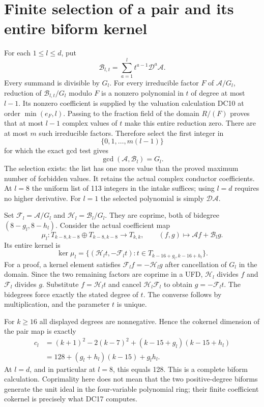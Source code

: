 \section{Finite selection of a pair and its entire biform kernel}
For each $1\le l\le d$, put
\[
 \mathcal B_{l,t}=\sum_{a=1}^{l}t^{a-1}\mathcal D^a\mathcal A.
                                                                    \tag{DC13}
\]
Every summand is divisible by $G_l$.  For every irreducible factor
$F$ of $\mathcal A/G_l$, reduction of
$\mathcal B_{l,t}/G_l$ modulo $F$ is a nonzero polynomial in $t$ of
degree at most $l-1$.  Its nonzero coefficient is supplied by the
valuation calculation DC10 at order $\min(e_F,l)$.
Passing to the fraction field of the domain $R/(F)$ proves that
at most $l-1$ complex values of $t$ make this entire reduction zero.
There are at most $m$ such irreducible factors.  Therefore select the
first integer in
\[
 \{0,1,\ldots,m(l-1)\}
\]
for which the exact gcd test gives
\[
 \gcd(\mathcal A,\mathcal B_l)=G_l.                              \tag{DC14}
\]
The selection exists: the list has one more value than the proved
maximum number of forbidden values.  It retains the actual complex
conductor coefficients.  At $l=8$ the uniform list of 113 integers
in the intake suffices; using $l=d$ requires no higher derivative.
For $l=1$ the selected polynomial is simply $\mathcal D\mathcal A$.

Set $\mathcal F_l=\mathcal A/G_l$ and
$\mathcal H_l=\mathcal B_l/G_l$.  They are coprime, both of
bidegree $(8-g_l,8-h_l)$.  Consider the actual coefficient map
\[
 \mu_l:T_{k-8,k-8}\oplus T_{k-8,k-8}\longrightarrow T_{k,k},
 \qquad (f,g)\longmapsto\mathcal Af+\mathcal B_lg.                \tag{DC15}
\]
Its entire kernel is
\[
 \ker\mu_l=
 \{(\mathcal H_l t,-\mathcal F_l t):
                 t\in T_{k-16+g_l,k-16+h_l}\}.                  \tag{DC16}
\]
For a proof, a kernel element satisfies
$\mathcal F_l f=-\mathcal H_l g$ after cancellation of $G_l$ in
the domain.  Since the two remaining factors are coprime in a UFD,
$\mathcal H_l$ divides $f$ and $\mathcal F_l$ divides $g$.  Substitute
$f=\mathcal H_l t$ and cancel $\mathcal H_l\mathcal F_l$ to obtain
$g=-\mathcal F_l t$.  The bidegrees force exactly the stated degree
of $t$.  The converse follows by multiplication, and the parameter
$t$ is unique.

For $k\ge16$ all displayed degrees are nonnegative.  Hence the
cokernel dimension of the pair map is exactly
\[
 \begin{split}
 c_l&=(k+1)^2-2(k-7)^2
             +(k-15+g_l)(k-15+h_l)\\
    &=128+(g_l+h_l)(k-15)+g_lh_l.                                \end{split}\tag{DC17}
\]
At $l=d$, and in particular at $l=8$, this equals 128.  This is a
complete biform calculation.  Coprimality here does not mean that
the two positive-degree biforms generate the unit ideal in the
four-variable polynomial ring; their finite coefficient cokernel
is precisely what DC17 computes.

